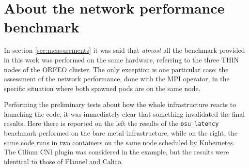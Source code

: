 \chapter{About the network performance benchmark}\label{appendix:kprod}

In section \ref{sec:measurements} it was said that \textit{almost} all the
benchmark provided in this work was performed on the same hardware, referring to
the three THIN nodes of the ORFEO cluster.
The only exception is one particular case: the assessment of the network
performance, done with the MPI operator, in the specific situation where both
spawned pods are on the same node.

Performing the preliminary tests about how the whole infrastructure reacts to
launching the code, it was immediately clear that something invalidated the
final results.
Here there is reported on the left the results of the \texttt{osu\_latency}
benchmark performed on the bare metal infrastructure, while on the right, the
same code runs in two containers on the same node scheduled by
Kubernetes. The Cilium CNI plugin was considered in the example, but the results
were identical to those of Flannel and Calico.


